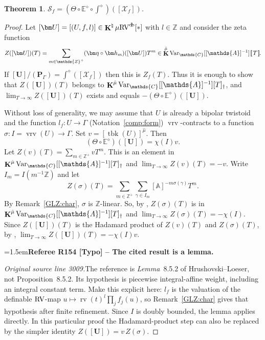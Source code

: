 \documentclass[12pt]{amsart}
\newcommand{\RefereeRemark}[4]{%
  \par\medskip\begingroup\normalfont\small\color{RefereePurple}%
  \emergencystretch=1.5em\noindent\textbf{Referee R#1 [#2] -- #3.}\par\nobreak\noindent #4\par
  \endgroup\medskip
}
\theoremstyle{plain}
\newtheorem{thm}{Theorem}[section]
\theoremstyle{definition}
\theoremstyle{remark}
\numberwithin{equation}{section}
\theoremstyle{plain}
\newcommand{\RV}{\textup{RV}}
\newcommand{\Z}{\mathds{Z}}
\newcommand{\A}{\mathds{A}}
\newcommand{\C}{\mathds{C}}
\newcommand{\0}{\emptyset}
\newcommand{\dbra}[1]{%
  \,[\mkern-6.8mu[\, #1 \,]\mkern-6.8mu]}
\newcommand{\mdl}[1]{\mathcal{#1}}  %
\newcommand{\bb}[1]{\mathbb{#1}}
\newcommand{\limplies}{\rightarrow}
\newcommand{\fun}{\longrightarrow}
\newcommand{\mgRV}{{\mu}{\RV}}
\DeclareMathOperator{\rv}{rv}
\DeclareMathOperator{\ggk}{\mathbf{K}}
\DeclareMathOperator{\vrv}{vrv}
\DeclareMathOperator{\db}{d \! b}
\newcommand{\var}{\textup{Var}}
\DeclareMathOperator{\tbk}{tbk}
\newcommand{\gmv}{\ggk^{\hat \mu}\var_{\C}}
\begin{document}
\begin{thm}\label{direct:mil}
$\mathscr S_f = (\Theta \circ \bb E^{\diamond} \circ \int^{\diamond})([\mdl X_f])$.
\end{thm}
\begin{proof}
Let $[\bm U] = [(U, f, l)] \in \ggk^\natural \mgRV^{\db}[*]$ with $l \in \Z$  and consider the zeta function
\begin{equation}\label{U:zeta}
Z([\bm U])(T) = \sum_{m \in \Z^+} (\bm \eta \circ \bm h_m)([\bm U]) T^m \in \gmv[[\A]^{-1}]\dbra T.
\end{equation}
If $[\bm U] / (\bm P_\Gamma) = \int^{\diamond}([\mdl X_f])$ then this is $Z_f(T)$. Thus it is enough to show that  $Z([\bm U])(T)$ belongs to $\gmv[[\A]^{-1}][T]_{\dag}$, and $\lim_{T \limplies \infty} Z([\bm U])(T)$ exists and equals $- (\Theta \circ \bb E^{\diamond})([\bm U])$.

Without loss of generality, we may assume that $U$ is already a bipolar twistoid and the function $l_f: U \fun \Gamma$ (Notation~\ref{comp:form}) $\vrv$-contracts to a function $\sigma : I = \vrv(U) \fun \Gamma$.  Set $v = [\tbk(U)]^{\hat \mu}$. Then
\[
(\Theta \circ \bb E^{\diamond})([\bm U]) = \chi(I) v.
\]
Let $Z(v)(T) = \sum_{m \in \Z^+} v T^m$. This is an element in $\gmv[[\A]^{-1}][T]_{\dag}$ and $\lim_{T \limplies \infty}Z(v)(T) = -v$. Write  $I_{m} = I(m^{-1}\Z)$ and let
\[
Z(\sigma)(T) = \sum_{m \in \Z^+} \sum_{\gamma \in I_{m}} [\A]^{-m \sigma(\gamma)} T^m.
\]
By Remark~\ref{GLZ:char}, $\sigma$ is $\Z$-linear. So, by \cite[Proposition~8.5.2]{hru:loe:lef}, $Z(\sigma)(T)$ is in $\gmv[[\A]^{-1}][T]_{\dag}$ and $\lim_{T \limplies \infty}Z(\sigma)(T) = -\chi(I)$. Since $Z([\bm U])(T)$ is the Hadamard product of $Z(v)(T)$ and $Z(\sigma)(T)$, by \cite[Lemma~8.4.1]{hru:loe:lef}, $\lim_{T \limplies \infty}Z([\bm U])(T) = - \chi(I) v$.

\RefereeRemark{154}{Typo}{The cited result is a lemma}{%
\textit{Original source line 3009.}\quad The reference is \emph{Lemma}~8.5.2 of Hrushovski--Loeser, not Proposition~8.5.2. Its hypothesis is piecewise integral-affine weight, including an integral constant term. Make this explicit here: $l_f$ is the valuation of the definable $\RV$-map $u\mapsto\rv(t)^l\prod_j f_j(u)$, so Remark~\ref{GLZ:char} gives that hypothesis after finite refinement. Since $I$ is doubly bounded, the lemma applies directly. In this particular proof the Hadamard-product step can also be replaced by the simpler identity $Z([\bm U])=v\,Z(\sigma)$.
}
\end{proof}
\end{document}
